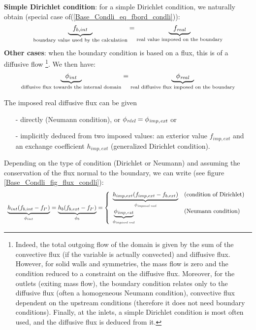 {\bf Simple Dirichlet condition}: for a simple Dirichlet condition, we
naturally obtain (special case of(\ref{Base_Condli_eq_fbord_condli})):
\begin{equation}
\underbrace{\ \ f_{b,int}\ \ }_{\text{boundary value used by the calculation}}
= \underbrace{\ \ f_{\text{\it real}}\ \ }_{\text{real value imposed on the boundary}}
\end{equation}
{\bf Other cases}: when the boundary condition is based on a flux,
this is of a diffusive flow \footnote{Indeed, the total outgoing flow of the domain is
given by the
sum of the convective flux (if the variable is actually convected)
and diffusive flux. However, for solid walls and symmetries, the mass flow is zero and
the condition reduced to a constraint on the diffusive flux. Moreover, for the
outlets (exiting mass flow), the boundary condition relates only to the
diffusive flux (often a homogeneous Neumann condition), convective flux
dependent on the upstream conditions (therefore it does not need
boundary conditions). Finally, at the inlets, a simple Dirichlet condition is most often
used, and the diffusive flux is deduced from it.}.
We then have:
\begin{equation}
\underbrace{\ \ \phi_{int}\ \ }_{\text{diffusive flux towards the internal domain}}
= \underbrace{\ \ \phi_{\text{\it real}}\ \ }_{\text{real diffusive flux imposed on the boundary}}
\end{equation}

The imposed real diffusive flux can be given
\begin{itemize}
\item [-] directly (Neumann condition), or
$\phi_{\text{\it r\'eel}}=\phi_{\text{\it imp,ext}}$ or
\item [-] implicitly deduced from two imposed values: an exterior value
$f_{imp,ext}$ and an exchange coefficient $h_{imp,ext}$
(generalized Dirichlet condition).
\end{itemize}

\vspace{1cm}
Depending on the type of condition (Dirichlet or Neumann) and assuming
the conservation of the flux normal to the boundary,
we can write (see figure \ref{Base_Condli_fig_flux_condli}):
\begin{equation}\label{Base_Condli_eq_flux_condli}
\begin{array}{l}
    \underbrace{h_{int}(f_{b,int}-f_{I'})}_{\phi_{int}}
  = \underbrace{h_{b}(f_{b,ext}-f_{I'})}_{\phi_{b}}
  = \left\{\begin{array}{ll}
    \underbrace{h_{imp,ext}(f_{imp,ext}-f_{b,ext})}_{\phi_{\text{\it imposed real}}} &\text{(condition of Dirichlet)}\\
    \underbrace{\phi_{\text{\it imp,ext}}}_{\phi_{\text{\it imposed real}}}
            &\text{(Neumann condition)}
           \end{array}\right.
\end{array}
\end{equation}

